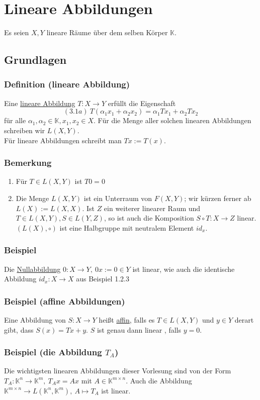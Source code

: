 \section{Lineare Abbildungen}
Es seien $X,Y$ lineare Räume über dem selben Körper $\mathbb{K}$.
\subsection{Grundlagen}
\subsubsection{Definition (lineare Abbildung)}
Eine \underline{lineare Abbildung} $T: X\rightarrow Y$ erfüllt die Eigenschaft
\[(3.1a)\ T(\alpha _1x_1+\alpha _2x_2)=\alpha _1Tx_1+\alpha _2Tx_2\]
für alle $\alpha _1,\alpha _2\in\mathbb{K},x_1,x_2\in X$.  Für die Menge aller solchen linearen Abbildungen schreiben wir $L(X,Y)$.\\
Für lineare Abbildungen schreibt man $Tx:=T(x)$.
\subsubsection{Bemerkung}
\renewcommand{\labelenumi}{(\arabic{enumi})}
\begin{enumerate}
\item Für $T\in L(X,Y)$ ist $T0=0$
\item Die Menge $L(X,Y)$ ist ein Unterraum von $F(X,Y)$; wir kürzen ferner ab $L(X):=L(X,X)$.  Ist $Z$ ein weiterer linearer Raum und $T\in L(X,Y),S\in L(Y,Z)$, so ist auch die Komposition $S\circ T:X\rightarrow Z$ linear. $(L(X),\circ )$ ist eine Halbgruppe mit neutralem Element $id_x$.
\end{enumerate}
\subsubsection{Beispiel}
Die \underline{Nullabbildung} $0:X\rightarrow Y,\ 0x:=0\in Y$ ist linear, wie auch die identische Abbildung $id_x:X\rightarrow X$ aus Beispiel 1.2.3
\subsubsection{Beispiel (affine Abbildungen)}
Eine Abbildung von $S:X\rightarrow Y$ heißt \underline{affin}, falls es $T\in L(X,Y)$ und $y\in Y$ derart gibt, dass $S(x)=Tx+y$.  $S$ ist genau dann linear , falls $y=0$.
\subsubsection{Beispiel (die Abbildung $T_A$)}
Die wichtigsten linearen Abbildungen dieser Vorlesung sind von der Form $T_A:\mathbb{K}^n\rightarrow \mathbb{K}^m,\ T_Ax=Ax$ mit $A\in\mathbb{K}^{m\times n}$.  Auch die Abbildung $\mathbb{K}^{m\times n}\rightarrow L(\mathbb{K}^n,\mathbb{K}^m),\ A\mapsto T_A$ ist linear.
